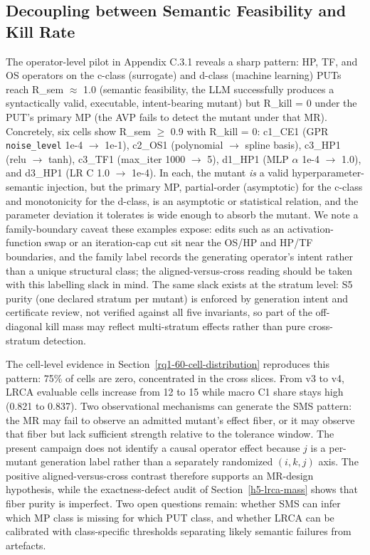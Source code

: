 \documentclass[manuscript,screen,review]{acmart}
\begin{document}
\subsection{Decoupling between Semantic Feasibility and Kill Rate}\label{decoupling-between-r_sem-and-r_kill}

The operator-level pilot in Appendix C.3.1 reveals a sharp pattern: HP,
TF, and OS operators on the c-class (surrogate) and d-class (machine
learning) PUTs reach R\_sem $\approx$ 1.0 (semantic feasibility, the LLM
successfully produces a syntactically valid, executable, intent-bearing
mutant) but R\_kill = 0 under the PUT's primary MP (the AVP fails to
detect the mutant under that MR). Concretely, six cells show R\_sem $\geq$
0.9 with R\_kill = 0: c1\_CE1 (GPR \texttt{noise\_level} 1e-4 $\to$ 1e-1),
c2\_OS1 (polynomial $\to$ spline basis), c3\_HP1 (relu $\to$ tanh), c3\_TF1
(max\_iter 1000 $\to$ 5), d1\_HP1 (MLP $\alpha$ 1e-4 $\to$ 1.0), and d3\_HP1 (LR C 1.0
$\to$ 1e-4). In each, the mutant \emph{is} a valid hyperparameter-semantic
injection, but the primary MP, partial-order (asymptotic) for the
c-class and
monotonicity for the d-class, is an asymptotic or statistical relation,
and the parameter deviation it tolerates is wide enough to absorb the
mutant. We note a family-boundary caveat these examples expose: edits
such as an activation-function swap or an iteration-cap cut sit near
the OS/HP and HP/TF boundaries, and the family label records the
generating operator's intent rather than a unique structural class;
the aligned-versus-cross reading should be taken with this labelling
slack in mind. The same slack exists at the stratum level: S5 purity
(one declared stratum per mutant) is enforced by generation intent and
certificate review, not verified against all five invariants, so part
of the off-diagonal kill mass may reflect multi-stratum effects rather
than pure cross-stratum detection.

The cell-level evidence in Section~\ref{rq1-60-cell-distribution} reproduces this pattern: 75\% of cells
are zero, concentrated in the cross slices. From v3 to v4, LRCA
evaluable cells increase from 12 to 15 while macro C1 share stays high
(0.821 to 0.837). Two observational mechanisms can generate the SMS
pattern: the MR may fail to observe an admitted mutant's effect fiber,
or it may observe that fiber but lack sufficient strength relative to
the tolerance window. The present campaign does not identify a causal
operator effect because \(j\) is a per-mutant generation label rather
than a separately randomized \((i,k,j)\) axis. The positive
aligned-versus-cross contrast therefore supports an MR-design
hypothesis, while the exactness-defect audit of
Section~\ref{h5-lrca-mass} shows that fiber purity is imperfect. Two open questions remain:
whether SMS can infer which MP class is missing for which PUT class, and
whether LRCA can be calibrated with class-specific thresholds separating
likely semantic failures from artefacts.
\end{document}
